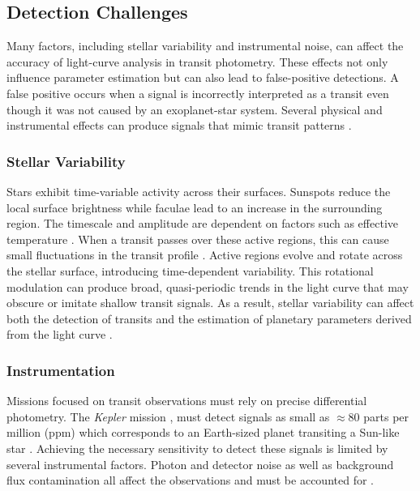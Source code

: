 \subsection{Detection Challenges} \label{sec:Detection_Challenges}

Many factors, including stellar variability and instrumental noise, can affect the accuracy of light-curve analysis in transit photometry. These effects not only influence parameter estimation but can also lead to false-positive detections. A false positive occurs when a signal is incorrectly interpreted as a transit even though it was not caused by an exoplanet-star system. Several physical and instrumental effects can produce signals that mimic transit patterns \citep{Morton_2016}.

\subsubsection{Stellar Variability}

Stars exhibit time-variable activity across their surfaces. Sunspots reduce the local surface brightness while faculae lead to an increase in the surrounding region. The timescale and amplitude are dependent on factors such as effective temperature \citep{2012IAUS..285..364M}. When a transit passes over these active regions, this can cause small fluctuations in the transit profile \citep{2013A&A...556A..19O}. Active regions evolve and rotate across the stellar surface, introducing time-dependent variability. This rotational modulation can produce broad, quasi-periodic trends in the light curve that may obscure or imitate shallow transit signals. As a result, stellar variability can affect both the detection of transits and the estimation of planetary parameters derived from the light curve \citep{Bonomo_2009}.

\subsubsection{Instrumentation} 

Missions focused on transit observations must rely on precise differential photometry. The \textit{Kepler} mission \citep{2016RPPh...79c6901B}, must detect signals as small as $\approx80$ parts per million (ppm) which corresponds to an Earth-sized planet transiting a Sun-like star \citep{2010ApJ...713L..92C}. Achieving the necessary sensitivity to detect these signals is limited by several instrumental factors. Photon and detector noise as well as background flux contamination all affect the observations and must be accounted for \citep{2011ApJS..197....6G}. 

